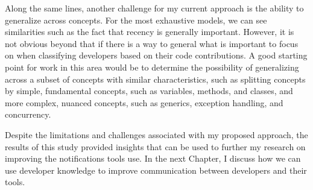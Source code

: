 Along the same lines, another challenge for my current approach is the ability to generalize across concepts. For the most exhaustive models, we can see similarities such as the fact that recency is generally important. However, it is not obvious beyond that if there is a way to general what is important to focus on when classifying developers based on their code contributions. A good starting point for work in this area would be to determine the possibility of generalizing across a subset of concepts with similar characteristics, such as splitting concepts by simple, fundamental concepts, such as variables, methods, and classes, and more complex, nuanced concepts, such as generics, exception handling, and concurrency.

Despite the limitations and challenges associated with my proposed approach, the results of this study provided insights that can be used to further my research on improving the notifications tools use. In the next Chapter, I discuss how we can use developer knowledge to improve communication between developers and their tools.